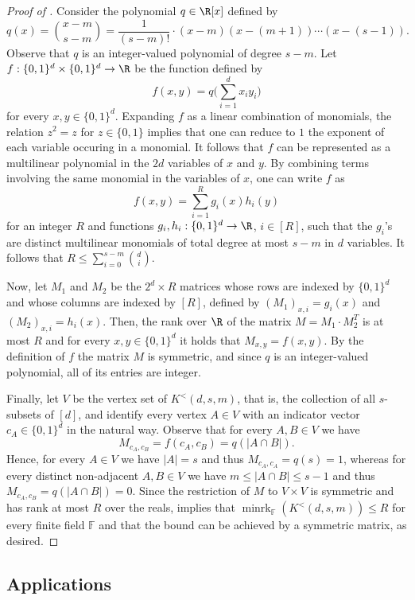 \documentclass{toc}
\newcommand{\Fset}{\mathbb{F}}
\newcommand{\minrank}{\mathop{\mathrm{minrk}}}
\newcommand\Kneser[3]{K^<(#1,#2,#3)}
\begin{document}
\begin{proof}[Proof of ]
Consider the polynomial $q \in \R[x]$ defined by
\[q(x) = {\binom {x-m} {s-m}} = \frac{1}{(s-m)!} \cdot (x-m)(x-(m+1)) \cdots (x-(s-1)).\]
Observe that $q$ is an integer-valued polynomial of degree $s-m$.
%
%
Let $f: \{0,1\}^d \times \{0,1\}^d \rightarrow \R$ be the function defined by
\[ f(x,y) = q  \Big ( \sum_{i=1}^{d}{x_i y_i}\Big )\]
for every $x,y \in \{0,1\}^d$.
Expanding $f$ as a linear combination of monomials, the relation $z^2 = z$ for $z \in \{0,1\}$ implies that one can reduce to $1$ the exponent of each variable occuring in a monomial. It follows that $f$ can be represented as a multilinear polynomial in the $2d$ variables of $x$ and $y$. By combining terms involving the same monomial in the variables of $x$, one can write $f$ as
\[ f(x,y) = \sum_{i=1}^{R}{g_i(x) h_i(y)} \]
for an integer $R$ and functions $g_i, h_i : \{0,1\}^d \rightarrow \R$, $i \in [R]$, such that the $g_i$'s are distinct multilinear monomials of total degree at most $s-m$ in $d$ variables. It follows that $R \leq \sum_{i=0}^{s-m}\binom{d}{i}$.

Now, let $M_1$ and $M_2$ be the $2^d \times R$ matrices whose rows are indexed by $\{0,1\}^d$ and whose columns are indexed by $[R]$, defined by $(M_1)_{x,i} = g_i(x)$ and $(M_2)_{x,i} = h_i(x)$. Then, the rank over $\R$ of the matrix $M = M_1 \cdot M_2^T$ is at most $R$ and for every $x,y \in\{0,1\}^d$ it holds that $M_{x,y} = f(x,y)$. By the definition of $f$ the matrix $M$ is symmetric, and since $q$ is an integer-valued polynomial, all of its entries are integer.

Finally, let $V$ be the vertex set of $\Kneser{d}{s}{m}$, that is, the collection of all $s$-subsets of $[d]$, and identify every vertex $A \in V$ with an indicator vector $c_A \in \{0,1\}^d$ in the natural way.
Observe that for every $A,B \in V$ we have
\[M_{c_A, c_B} = f(c_A,c_B) = q(|A \cap B|).\]
Hence, for every $A \in V$ we have $|A|=s$ and thus $M_{c_A,c_A} =q(s) = 1$, whereas for every distinct non-adjacent $A,B \in V$ we have $m \leq |A \cap B|\leq s-1$ and thus $M_{c_A,c_B} = q(|A \cap B|) =0$.
Since the restriction of $M$ to $V \times V$ is symmetric and has rank at most $R$ over the reals,  implies that ${\minrank}_{\Fset}(\Kneser{d}{s}{m}) \leq R$ for every finite field $\Fset$ and that the bound can be achieved by a symmetric matrix, as desired.
\end{proof}

\subsection{Applications}
\end{document}
